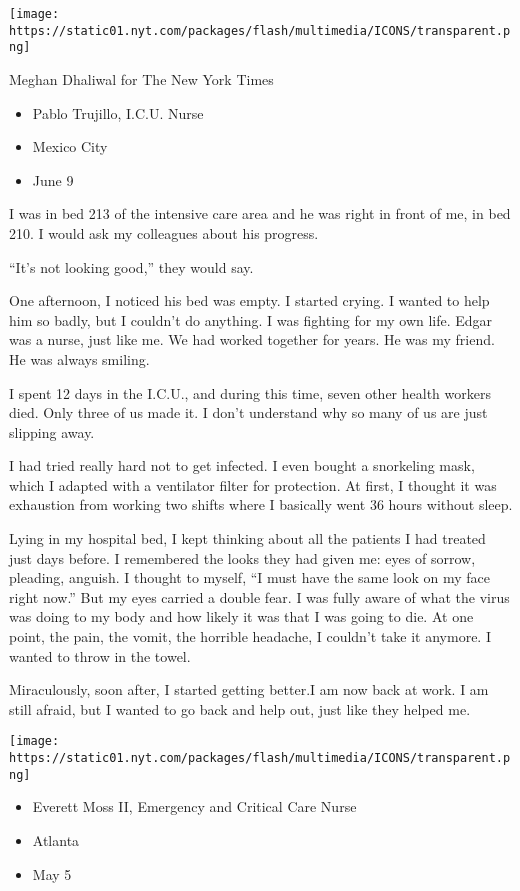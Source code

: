 \texttt{[image: https://static01.nyt.com/packages/flash/multimedia/ICONS/transparent.png]}

Meghan Dhaliwal for The New York Times

\begin{itemize}
\tightlist
\item
  Pablo Trujillo, I.C.U. Nurse
\item
  Mexico City
\item
  June 9
\end{itemize}

I was in bed 213 of the intensive care area and he was right in front of
me, in bed 210. I would ask my colleagues about his progress.

``It's not looking good,'' they would say.

One afternoon, I noticed his bed was empty. I started crying. I wanted
to help him so badly, but I couldn't do anything. I was fighting for my
own life. Edgar was a nurse, just like me. We had worked together for
years. He was my friend. He was always smiling.

I spent 12 days in the I.C.U., and during this time, seven other health
workers died. Only three of us made it. I don't understand why so many
of us are just slipping away.

I had tried really hard not to get infected. I even bought a snorkeling
mask, which I adapted with a ventilator filter for protection. At first,
I thought it was exhaustion from working two shifts where I basically
went 36 hours without sleep.

Lying in my hospital bed, I kept thinking about all the patients I had
treated just days before. I remembered the looks they had given me: eyes
of sorrow, pleading, anguish. I thought to myself, ``I must have the
same look on my face right now.'' But my eyes carried a double fear. I
was fully aware of what the virus was doing to my body and how likely it
was that I was going to die. At one point, the pain, the vomit, the
horrible headache, I couldn't take it anymore. I wanted to throw in the
towel.

Miraculously, soon after, I started getting better.I am now back at
work. I am still afraid, but I wanted to go back and help out, just like
they helped me.

\texttt{[image: https://static01.nyt.com/packages/flash/multimedia/ICONS/transparent.png]}

\begin{itemize}
\tightlist
\item
  Everett Moss II, Emergency and Critical Care Nurse
\item
  Atlanta
\item
  May 5
\end{itemize}

